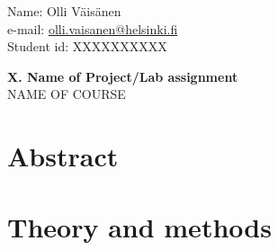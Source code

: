 \documentclass[a4paper, twoside, 12pt]{artikel3} %
\makeatletter
\newcommand{\email}{\href{mailto:olli.vaisanen@helsinki.fi}{olli.vaisanen@helsinki.fi}} %
\makeatother
\begin{document}
\dmyyyydate %

%

\thispagestyle{empty} 
Name: Olli Väisänen \hfill   \\%
e-mail: \email \hfill   \\%
Student id: XXXXXXXXXX \hfill  \\%
\vfill
\begin{center}
\textbf{\LARGE X. Name of Project/Lab assignment}\\ %
NAME OF COURSE %
\end{center}
\vfill

\clearpage

\pagestyle{plain}

\section*{Abstract} 
	
	
\section{Theory and methods}

	
\end{document}
